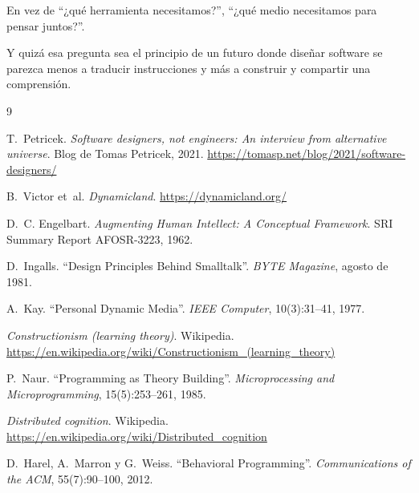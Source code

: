 \documentclass[11pt,a4paper]{article}
\begin{document}
En vez de ``¿qué herramienta necesitamos?'', ``¿qué medio necesitamos para
pensar juntos?''.

Y quizá esa pregunta sea el principio de un futuro donde diseñar software se
parezca menos a traducir instrucciones y más a construir y compartir una
comprensión.

\begin{thebibliography}{9}

T.~Petricek.
\emph{Software designers, not engineers: An interview from alternative
universe}. Blog de Tomas Petricek, 2021.
\url{https://tomasp.net/blog/2021/software-designers/}

B.~Victor et~al.
\emph{Dynamicland}.
\url{https://dynamicland.org/}

D.~C. Engelbart.
\emph{Augmenting Human Intellect: A Conceptual Framework}.
SRI Summary Report AFOSR-3223, 1962.

D.~Ingalls.
``Design Principles Behind Smalltalk''.
\emph{BYTE Magazine}, agosto de 1981.

A.~Kay.
``Personal Dynamic Media''.
\emph{IEEE Computer}, 10(3):31--41, 1977.

\emph{Constructionism (learning theory)}. Wikipedia.
\url{https://en.wikipedia.org/wiki/Constructionism_(learning_theory)}

P.~Naur.
``Programming as Theory Building''.
\emph{Microprocessing and Microprogramming}, 15(5):253--261, 1985.

\emph{Distributed cognition}. Wikipedia.
\url{https://en.wikipedia.org/wiki/Distributed_cognition}

D.~Harel, A.~Marron y G.~Weiss.
``Behavioral Programming''.
\emph{Communications of the ACM}, 55(7):90--100, 2012.

\end{thebibliography}
\end{document}
